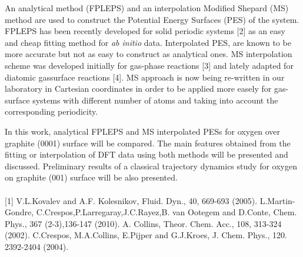 An analytical method (FPLEPS) and an interpolation Modified Shepard (MS)
method are used to construct the Potential Energy Surfaces (PES) of the system.
FPLEPS has been recently developed for solid periodic systems [2] as an easy and
cheap fitting method for \textit{ab initio} data. Interpolated PES, are known to be more
accurate but not as easy to construct as analytical ones. MS interpolation scheme was
developed initially for gas-phase reactions [3] and lately adapted for diatomic gassurface reactions [4].
MS approach is now being re-written in our laboratory in
Cartesian coordinates in order to be applied more easely for gas-surface systems with
different number of atoms and taking into account the corresponding periodicity.

In this work, analytical FPLEPS and MS interpolated PESs for oxygen over graphite
(0001) surface will be compared. The main features obtained from the fitting or
interpolation of DFT data using both methods will be presented and discussed.
Preliminary results of a classical trajectory dynamics study for oxygen on graphite
(001) surface will be also presented.
\\
\vspace{0.5cm}
\\
{\footnotesize
[1] V.L.Kovalev and A.F. Kolesnikov, Fluid. Dyn., 40, 669-693 (2005).
\newline
[2] L.Martin-Gondre, C.Crespos,P.Larregaray,J.C.Rayez,B. van Ootegem and D.Conte, Chem. Phys.,
367 (2-3),136-147 (2010).
\newline
[3] A. Collins, Theor. Chem. Acc., 108, 313-324 (2002).
\newline
[4] C.Crespos, M.A.Collins, E.Pijper and G.J.Kroes, J. Chem. Phys., 120. 2392-2404 (2004).
}

